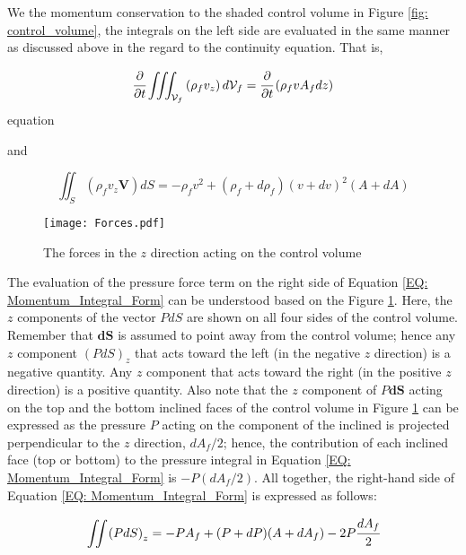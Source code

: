 \documentclass[../Article_Sensitivity_Analsysis.tex]{subfiles}
\begin{document}
	We the momentum conservation to the shaded control volume in Figure \ref{fig: control_volume}, the integrals on the left side are evaluated in the same manner as discussed above in the regard to the continuity equation. That is,
	
	{\footnotesize
		\begin{equation}
			\cfrac{\partial}{\partial t} \iiint_{\mathcal{V}_f} \left( \rho_f v_z \right) d \mathcal{V}_f = \cfrac{\partial}{\partial t} \left( \rho_f v A_f dz \right)
			\label{EQ: Force_Continuity_Monenmtum}
		\end{equation}equation
	}
	
	and 
	
	{\footnotesize
		\begin{equation}
			\iint_S \left( \rho_f v_z \textbf{V} \right) dS = -\rho_f v^2 + \left( \rho_f + d \rho_f \right) \left( v+dv \right)^2 \left( A+dA \right)
		\end{equation}
	}
	
	\begin{figure}[h]
		\centering
		\texttt{[image: Forces.pdf]}
		\caption{The forces in the $z$ direction acting on the control volume}
		\label{fig: Forces_Momentum_Control_Volume}
	\end{figure}
	
	The evaluation of the pressure force term on the right side of Equation \ref{EQ: Momentum_Integral_Form} can be understood based on the Figure \ref{fig: Forces_Momentum_Control_Volume}. Here, the $z$ components of the vector $PdS$ are shown on all four sides of the control volume. Remember that $\textbf{dS}$ is assumed to point away from the control volume; hence  any $z$ component $\left( PdS \right)_z$ that acts toward the left (in the negative $z$ direction) is a negative quantity. Any $z$ component that acts toward the right (in the positive $z$ direction) is a positive quantity. Also note that the $z$ component of $P\textbf{dS}$ acting on the top and the bottom inclined faces of the control volume in Figure \ref{fig: Forces_Momentum_Control_Volume} can be expressed as the pressure $P$ acting on the component of the inclined is projected perpendicular to the $z$ direction, $dA_f/2$; hence, the contribution of each inclined face (top or bottom) to the pressure integral in Equation \ref{EQ: Momentum_Integral_Form} is $-P(dA_f/2)$. All together, the right-hand side of Equation \ref{EQ: Momentum_Integral_Form} is expressed as follows:
	
	{\footnotesize
		\begin{equation}
			\iint \left( PdS \right)_z = -PA_f + (P+dP)(A+dA_f)-2P\cfrac{dA_f}{2}
			\label{EQ: Force_Integral_Varying_Cross_Section}
		\end{equation}
	}
	
\end{document}
